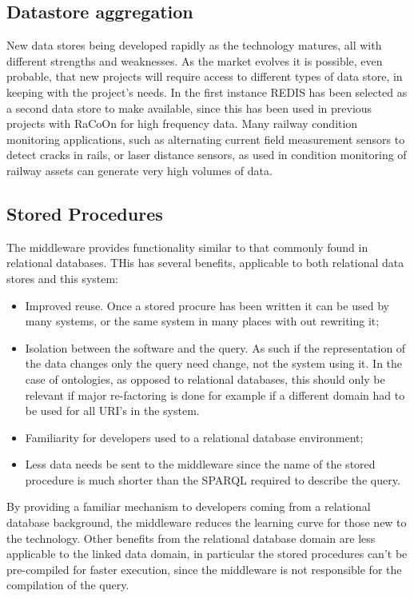 \subsection{Datastore aggregation}
New data stores being developed rapidly as the technology matures, all with different strengths and weaknesses. As the market evolves it is possible, even probable, that new projects will require access to different types of data store, in keeping with the project's needs. In the first instance REDIS has been selected as a second data store to make available, since this has been used in previous projects with RaCoOn for high frequency data. Many railway condition monitoring applications, such as alternating current field measurement sensors to detect cracks in rails, or laser distance sensors, as used in condition monitoring of railway assets can generate very high volumes of data.
\subsection{Stored Procedures}
The middleware provides  functionality similar to that commonly found in relational databases. THis has several benefits, applicable to both relational data stores and this system:

\begin{itemize}
    \item Improved reuse. Once a stored procure has been written it can be used by many systems, or the same system in many places with out rewriting it;
   \item Isolation between the software and the query. As such if the representation of the data changes only the query need change, not the system using it. In the case of ontologies, as opposed to relational databases, this should only be relevant if major re-factoring is done for example if a different domain had to be used for all URI's in the system.
    \item Familiarity for developers used to a relational database environment;    
    \item Less data needs be sent to the middleware since the name of the stored procedure is much shorter than the SPARQL required to describe the query. 
\end{itemize}

By providing a familiar mechanism to developers coming from a relational database background, the middleware reduces the learning curve for those new to the technology. Other benefits from the relational database domain are less applicable to the linked data domain, in particular the stored procedures can't be pre-compiled for faster execution, since the middleware is not responsible for the compilation of the query.

